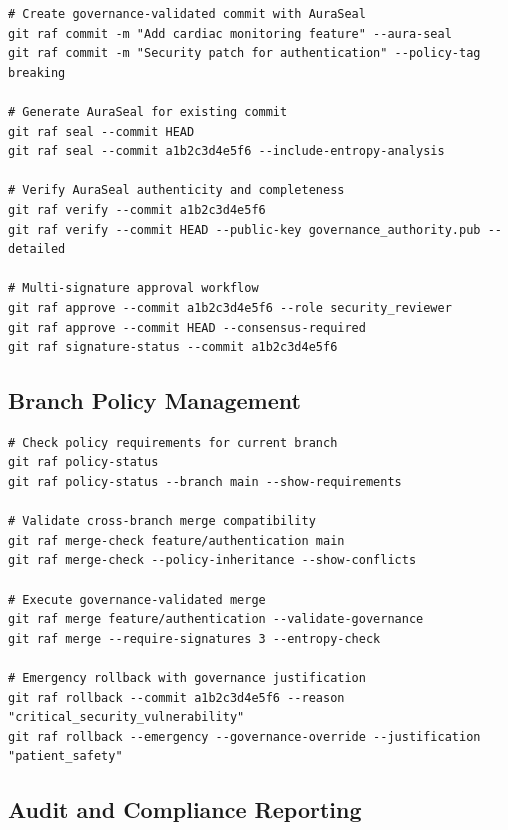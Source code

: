 \documentclass[11pt,letterpaper]{article}
\begin{document}
\begin{lstlisting}[language=shell, caption=AuraSeal Commit Commands]
# Create governance-validated commit with AuraSeal
git raf commit -m "Add cardiac monitoring feature" --aura-seal
git raf commit -m "Security patch for authentication" --policy-tag breaking

# Generate AuraSeal for existing commit
git raf seal --commit HEAD
git raf seal --commit a1b2c3d4e5f6 --include-entropy-analysis

# Verify AuraSeal authenticity and completeness
git raf verify --commit a1b2c3d4e5f6
git raf verify --commit HEAD --public-key governance_authority.pub --detailed

# Multi-signature approval workflow
git raf approve --commit a1b2c3d4e5f6 --role security_reviewer
git raf approve --commit HEAD --consensus-required
git raf signature-status --commit a1b2c3d4e5f6
\end{lstlisting}

\subsection{Branch Policy Management}

\begin{lstlisting}[language=shell, caption=Branch Governance Commands]
# Check policy requirements for current branch
git raf policy-status
git raf policy-status --branch main --show-requirements

# Validate cross-branch merge compatibility
git raf merge-check feature/authentication main
git raf merge-check --policy-inheritance --show-conflicts

# Execute governance-validated merge
git raf merge feature/authentication --validate-governance
git raf merge --require-signatures 3 --entropy-check

# Emergency rollback with governance justification
git raf rollback --commit a1b2c3d4e5f6 --reason "critical_security_vulnerability"
git raf rollback --emergency --governance-override --justification "patient_safety"
\end{lstlisting}

\subsection{Audit and Compliance Reporting}
\end{document}
